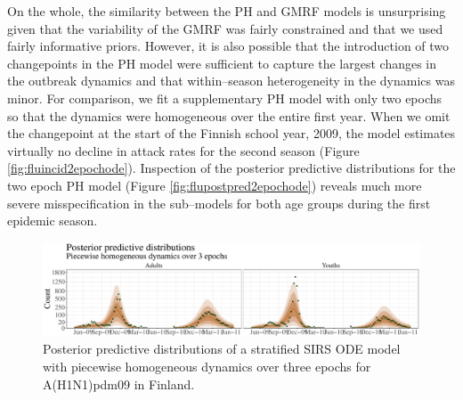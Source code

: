 On the whole, the similarity between the PH and GMRF models is unsurprising given that the variability of the GMRF was fairly constrained and that we used fairly informative priors. However, it is also possible that the introduction of two changepoints in the PH model were sufficient to capture the largest changes in the outbreak dynamics and that within--season heterogeneity in the dynamics was minor. For comparison, we fit a supplementary PH model with only two epochs so that the dynamics were homogeneous over the entire first year. When we omit the changepoint at the start of the Finnish school year, 2009, the model estimates virtually no decline in attack rates for the second season (Figure \ref{fig:fluincid2epochode}). Inspection of the posterior predictive distributions for the two epoch PH model (Figure \ref{fig:flupostpred2epochode}) reveals much more severe misspecification in the sub--models for both age groups during the first epidemic season.  

\begin{figure}[htbp]
	\centering
	\includegraphics[width=0.9\linewidth]{figures/flu_postpreds_const_ode}
	\caption{Posterior predictive distributions of a stratified SIRS ODE model with piecewise homogeneous dynamics over three epochs for A(H1N1)pdm09 in Finland.}
	\label{fig:flupostpredsconstode}
\end{figure}

